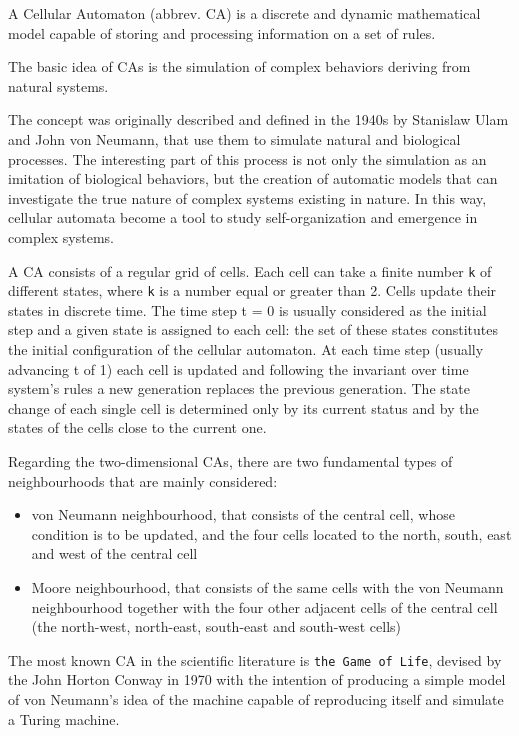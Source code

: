 A Cellular Automaton (abbrev. CA) is a discrete and dynamic mathematical model capable of storing and processing information on a set of rules.
\par
The basic idea of CAs is the simulation of complex behaviors deriving from natural systems.
\par
The concept was originally described and defined in the 1940s by Stanislaw Ulam and John von Neumann, that use them to simulate natural and biological processes. The interesting part of this process is not only the simulation as an imitation of biological behaviors, but the creation of automatic models that can investigate the true nature of complex systems existing in nature. In this way, cellular automata become a tool to study self-organization and emergence in complex systems.
\par
A CA consists of a regular grid of cells. Each cell can take a finite number \texttt{k} of different states, where \texttt{k} is a number equal or greater than 2. Cells update their states in discrete time. The time step t = 0 is usually considered as the initial step and a given state is assigned to each cell: the set of these states constitutes the initial configuration of the cellular automaton.
At each time step (usually advancing t of 1) each cell is updated and following the invariant over time system's rules a new generation replaces the previous generation. The state change of each single cell is determined only by its current status and by the states of the cells close to the current one.
\par
Regarding the two-dimensional CAs, there are two fundamental types of neighbourhoods that are mainly considered:
\begin{itemize}
\item von Neumann neighbourhood, that consists of the central cell, whose condition is to be updated, and the four cells located to the north, south, east and west of the central cell
\item Moore neighbourhood, that consists of the same cells with the von Neumann neighbourhood together with the four other adjacent cells of the central cell (the north-west, north-east, south-east and south-west cells)
\end{itemize}
\par
The most known CA in the scientific literature is \texttt{the Game of Life}, devised by the John Horton Conway in 1970 with the intention of producing a simple model of von Neumann's idea of the machine capable of reproducing itself and simulate a Turing machine. 
